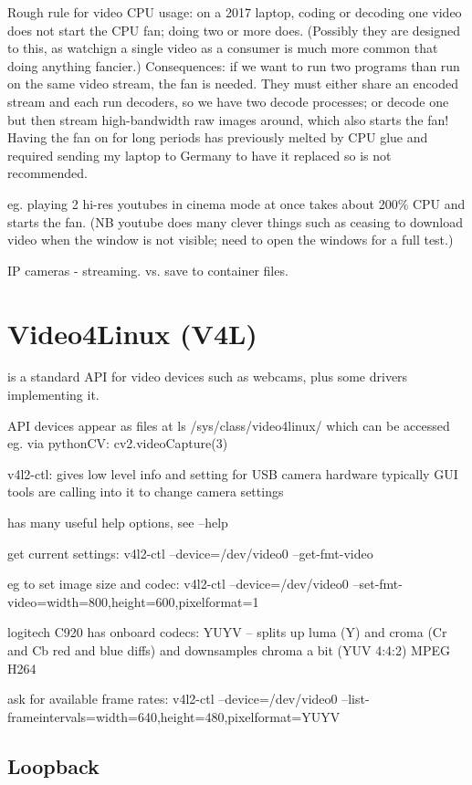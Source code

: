 \documentclass[oneside,english]{scrbook}
\begin{document}
Rough rule for video CPU usage: on a 2017 laptop, coding or decoding one video does not start the CPU fan; doing two or more does. (Possibly they are designed to this, as watchign a single video as a consumer is much more common that doing anything fancier.)  Consequences: if we want to run two programs than run on the same video stream, the fan is needed. They must either share an encoded stream and each run decoders, so we have two decode processes; or decode one but then stream high-bandwidth raw images around, which also starts the fan! Having the fan on for long periods has previously melted by CPU glue and required sending my laptop to Germany to have it replaced so is not recommended.

eg. playing 2 hi-res youtubes in cinema mode at once takes about 200\% CPU and starts the fan. (NB youtube does many clever things such as ceasing to download video when the window is not visible; need to open the windows for a full test.)

IP cameras - streaming.  vs. save to container files.

\chapter{Video4Linux (V4L)}

is a standard API for video devices such as webcams, plus some drivers
implementing it.

API devices appear as files at ls /sys/class/video4linux/ which can
be accessed eg. via pythonCV: cv2.videoCapture(3) 

v4l2-ctl: gives low level info and setting for USB camera hardware
typically GUI tools are calling into it to change camera settings

has many useful help options, see --help 

get current settings: v4l2-ctl --device=/dev/video0 --get-fmt-video

eg to set image size and codec: v4l2-ctl --device=/dev/video0 --set-fmt-video=width=800,height=600,pixelformat=1

logitech C920 has onboard codecs: YUYV -- splits up luma (Y) and croma
(Cr and Cb red and blue diffs) and downsamples chroma a bit (YUV 4:4:2)
MPEG H264

ask for available frame rates: v4l2-ctl --device=/dev/video0 --list-frameintervals=width=640,height=480,pixelformat=YUYV


\section{Loopback}
\label{loopback}
\end{document}
